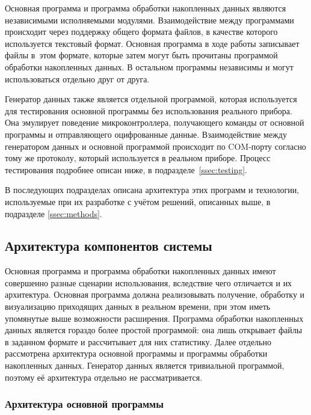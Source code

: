 \documentclass[a4paper, 14pt, titlepage]{extarticle}
\begin{document}
  Основная программа и программа обработки накопленных данных являются независимыми исполняемыми
  модулями. Взаимодействие между программами происходит через поддержку общего формата файлов, в
  качестве которого используется текстовый формат.
  Основная программа в ходе работы записывает файлы в~этом формате, которые затем могут быть прочитаны
  программой обработки накопленных данных. В остальном программы независимы и могут использоваться
  отдельно друг от друга.

  Генератор данных также является отдельной программой, которая используется для тестирования
  основной программы без использования реального прибора. Она эмулирует поведение микроконтроллера,
  получающего команды от основной программы и отправляющего оцифрованные данные. Взаимодействие
  между генератором данных и основной программой происходит по COM-порту согласно тому же протоколу,
  который используется в реальном приборе. Процесс тестирования подробнее описан ниже, в подразделе~\ref{ssec:testing}.

  В последующих подразделах описана архитектура этих программ и технологии, используемые при их
  разработке с учётом решений, описанных выше, в подразделе \ref{ssec:methods}.

  \subsection{Архитектура компонентов системы}\label{ssec:arch}

  Основная программа и программа обработки накопленных данных имеют совершенно разные сценарии
  использования, вследствие чего отличается и их архитектура. Основная программа должна
  реализовывать получение, обработку и визуализацию приходящих данных в реальном времени, при этом
  иметь упомянутые выше возможности расширения. Программа обработки накопленных данных является
  гораздо более простой программой: она лишь открывает файлы в заданном формате и рассчитывает для
  них статистику. Далее отдельно рассмотрена архитектура основной программы и программы обработки
  накопленных данных. Генератор данных является тривиальной программой, поэтому её архитектура
  отдельно не рассматривается.

  \subsubsection{Архитектура основной программы}\label{sssec:main-arch}
\end{document}
